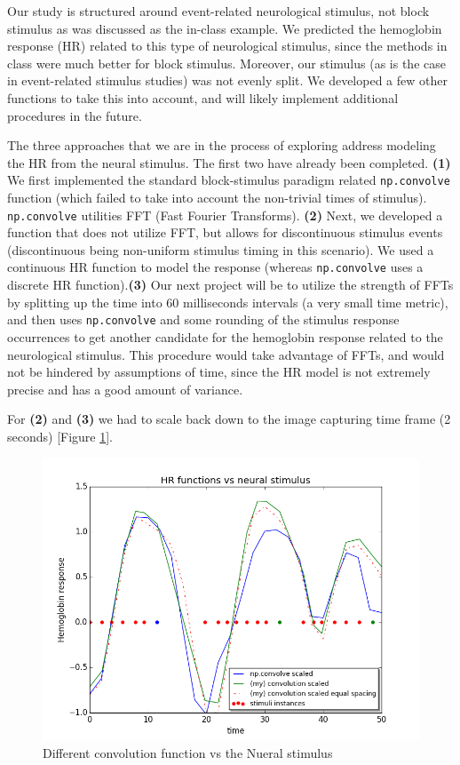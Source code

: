 \par \indent Our study is structured around event-related neurological stimulus, not block stimulus as was discussed as the in-class example. We predicted the hemoglobin response (HR) related to this type of neurological stimulus, since the methods in class were much better for block stimulus. Moreover, our stimulus (as is the case in event-related stimulus studies) was not evenly split. We developed a few other functions to take this into account, and will likely implement additional procedures in the future.

\par The three approaches that we are in the process of exploring address modeling the HR from the neural stimulus. The first two have already been completed. \textbf{(1)} We first implemented the standard block-stimulus paradigm related \texttt{np.convolve} function (which failed to take into account the non-trivial times of stimulus). \texttt{np.convolve} utilities FFT (Fast Fourier Transforms). \textbf{(2)} Next, we developed a function that does not utilize FFT, but allows for discontinuous stimulus events (discontinuous being non-uniform stimulus timing in this scenario). We used a continuous HR function to model the response (whereas \texttt{np.convolve} uses a discrete HR function).\textbf{(3)} Our next project will be to utilize the strength of FFTs by splitting up the time into 60 milliseconds intervals (a very small time metric), and then uses \texttt{np.convolve} and some rounding of the stimulus response occurrences to get another candidate for the hemoglobin response related to the neurological stimulus. This procedure would take advantage of FFTs, and would not be hindered by assumptions of time, since the HR model is not extremely precise and has a good amount of variance.
    
\par For \textbf{(2)} and \textbf{(3)} we had to scale back down to the image capturing time frame (2 seconds) [Figure \ref{fig:convolution}].


\begin{figure}[ht]
\centering
\includegraphics[scale=0.5]{images/convolution_vs_neural_stimulus} 
\caption{Different convolution function vs the Nueral stimulus}
\label{fig:convolution}
\end{figure}

